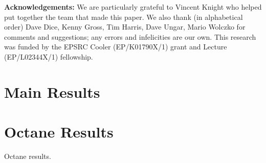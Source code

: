 \documentclass[preprint,numbers,10pt]{sigplanconf}
\begin{document}
\textbf{Acknowledgements:} We are particularly grateful to Vincent Knight
who helped put together the team that made this paper. We also thank (in alphabetical order) Dave Dice, Kenny
Gross, Tim Harris, Dave Ungar, Mario Wolczko for comments and suggestions; any
errors and infelicities are our own. This research was funded by the EPSRC
Cooler (EP/K01790X/1) grant and Lecture (EP/L02344X/1) fellowship.




\newpage

\appendix

\section{Main Results}
\label{app:mainresults}



\section{Octane Results}

\begin{table}[t]
\centering

\caption{Octane results.}
\label{tab:octane}
\end{table}
\end{document}
